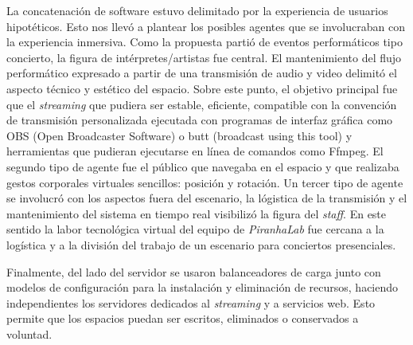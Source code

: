 

La concatenación de software estuvo delimitado por la experiencia de usuarios hipotéticos. Esto nos llevó a plantear los posibles agentes que se involucraban con la experiencia inmersiva. Como la propuesta partió de eventos performáticos tipo concierto, la figura de intérpretes/artistas fue central. El mantenimiento del flujo performático expresado a partir de una transmisión de audio y video delimitó el aspecto técnico y estético del espacio. Sobre este punto, el objetivo principal fue que el \textit{streaming} que pudiera ser estable, eficiente, compatible con la convención de transmisión personalizada ejecutada con programas de interfaz gráfica como OBS (Open Broadcaster Software) o butt (broadcast using this tool) y herramientas que pudieran ejecutarse en línea de comandos como Ffmpeg. El segundo tipo de agente fue el público que navegaba en el espacio y que realizaba gestos corporales virtuales sencillos: posición y rotación. Un tercer tipo de agente se involucró con los aspectos fuera del escenario, la lógistica de la transmisión y el mantenimiento del sistema en tiempo real visibilizó la figura del \textit{staff}. En este sentido la labor tecnológica virtual del equipo de \textit{PiranhaLab} fue cercana a la logística y a la división del trabajo de un escenario para conciertos presenciales. 


Finalmente, del lado del servidor se usaron balanceadores de carga junto con modelos de configuración para la instalación y eliminación de recursos, haciendo independientes los servidores dedicados al \textit{streaming} y a servicios web. Esto permite que los espacios puedan ser escritos, eliminados o conservados a voluntad. 
